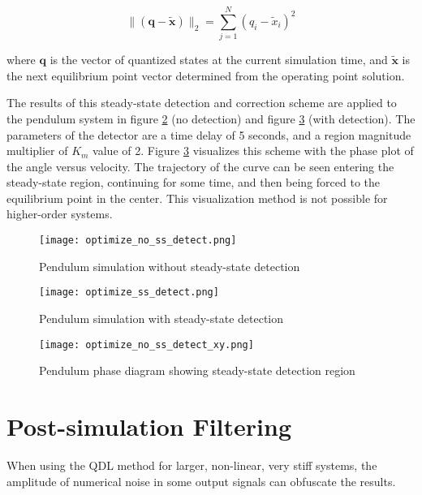 \begin{equation} \label{eq:q_dist}
\| \left( \mathbf{q - \tilde{x}} \right) \|_2 = \sum_{j=1}^{N}{ \left( q_i - \tilde{x}_i \right) ^2}
\end{equation}

where $\mathbf{q}$ is the vector of quantized states at the current simulation time, and $\mathbf{\tilde{x}}$ is the next equilibrium point vector determined from the operating point solution.

The results of this steady-state detection and correction scheme are applied to the pendulum system in figure \ref{fig:optimize_ss_detect} (no detection) and figure \ref{fig:optimize_no_ss_detect_xy} (with detection). The parameters of the detector are a time delay of 5 seconds, and a region magnitude multiplier of $K_m$ value of 2. Figure \ref{fig:optimize_no_ss_detect_xy} visualizes this scheme with the phase plot of the angle versus velocity. The trajectory of the curve can be seen entering the steady-state region, continuing for some time, and then being forced to the equilibrium point in the center. This visualization method is not possible for higher-order systems.

\begin{figure}[h]
    \centering
    \texttt{[image: optimize\_no\_ss\_detect.png]}
    \caption{Pendulum simulation without steady-state detection}
    \label{fig:optimize_no_ss_detect}
\end{figure}

\begin{figure}[h]
    \centering
    \texttt{[image: optimize\_ss\_detect.png]}
    \caption{Pendulum simulation with steady-state detection}
    \label{fig:optimize_ss_detect}
\end{figure}

\begin{figure}[h]
    \centering
    \texttt{[image: optimize\_no\_ss\_detect\_xy.png]}
    \caption{Pendulum phase diagram showing steady-state detection region}
    \label{fig:optimize_no_ss_detect_xy}
\end{figure}

\section{Post-simulation Filtering}\label{sec:filtering}

When using the QDL method for larger, non-linear, very stiff systems, the amplitude of numerical noise in some output signals can obfuscate the results.

